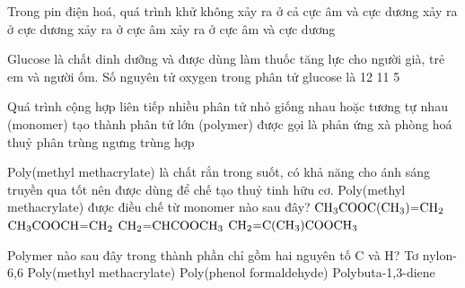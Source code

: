 \documentclass[11pt,a4paper]{article}
\begin{document}
\begin{ex}
Trong pin điện hoá, quá trình khử
\choice
{không xảy ra ở cả cực âm và cực dương}
{\True xảy ra ở cực dương}
{xảy ra ở cực âm}
{xảy ra ở cực âm và cực dương}

\end{ex}
\begin{ex}
Glucose là chất dinh dưỡng và được dùng làm thuốc tăng lực cho người già, trẻ em và người ốm. Số nguyên tử oxygen trong phân tử glucose là
\choice
{12}
{}
{11}
{5}

\end{ex}
\begin{ex}
Quá trình cộng hợp liên tiếp nhiều phân tử nhỏ giống nhau hoặc tương tự nhau (monomer) tạo thành phân tử lớn (polymer) được gọi là phản ứng
\choice
{xà phòng hoá}
{thuỷ phân}
{trùng ngưng}
{\True trùng hợp}

\end{ex}
\begin{ex}
Poly(methyl methacrylate) là chất rắn trong suốt, có khả năng cho ánh sáng truyền qua tốt nên được dùng để chế tạo thuỷ tinh hữu cơ. Poly(methyl methacrylate) được điều chế từ monomer nào sau đây?
\choice
{$\ce{CH3COOC(CH3)=CH2}$}
{$\ce{CH3COOCH=CH2}$}
{$\ce{CH2=CHCOOCH3}$}
{\True $\ce{CH2=C(CH3)COOCH3}$}

\end{ex}
\begin{ex}
Polymer nào sau đây trong thành phần chỉ gồm hai nguyên tố C và H?
\choice
{Tơ nylon-6,6}
{Poly(methyl methacrylate)}
{Poly(phenol formaldehyde)}
{\True Polybuta-1,3-diene}

\end{ex}
\end{document}
